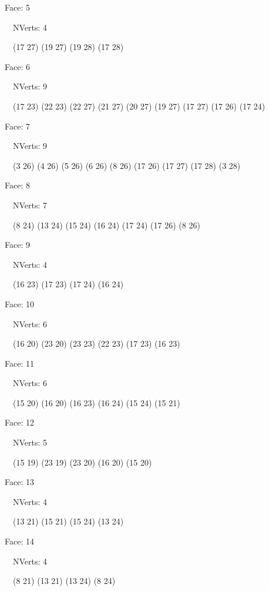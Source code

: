\documentclass{article}
\begin{document}
{\footnotesize 

Face: 5

\   \    NVerts: 4

 \   \   (17 27) (19 27) (19 28) (17 28)}

{\footnotesize 

Face: 6

\   \    NVerts: 9

 \   \   (17 23) (22 23) (22 27) (21 27) (20 27) (19 27) (17 27) (17 26) (17 24)}

{\footnotesize 

Face: 7

\   \    NVerts: 9

 \   \   (3 26) (4 26) (5 26) (6 26) (8 26) (17 26) (17 27) (17 28) (3 28)}

{\footnotesize 

Face: 8

\   \    NVerts: 7

 \   \   (8 24) (13 24) (15 24) (16 24) (17 24) (17 26) (8 26)}

{\footnotesize 

Face: 9

\   \    NVerts: 4

 \   \   (16 23) (17 23) (17 24) (16 24)}

{\footnotesize 

Face: 10

\   \    NVerts: 6

 \   \   (16 20) (23 20) (23 23) (22 23) (17 23) (16 23)}

{\footnotesize 

Face: 11

\   \    NVerts: 6

 \   \   (15 20) (16 20) (16 23) (16 24) (15 24) (15 21)}

{\footnotesize 

Face: 12

\   \    NVerts: 5

 \   \   (15 19) (23 19) (23 20) (16 20) (15 20)}

{\footnotesize 

Face: 13

\   \    NVerts: 4

 \   \   (13 21) (15 21) (15 24) (13 24)}

{\footnotesize 

Face: 14

\   \    NVerts: 4

 \   \   (8 21) (13 21) (13 24) (8 24)}
\end{document}
